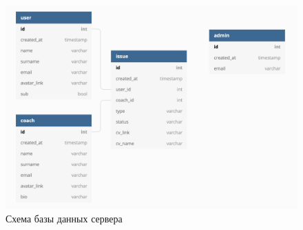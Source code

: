 \documentclass[a4papaer,12pt]{article}
\begin{document}
\begin{figure}[H]
    \centering
    \includegraphics[width=0.7\linewidth]{3}
    \caption{Схема базы данных сервера}
\end{figure}

\newpage


\end{document}
